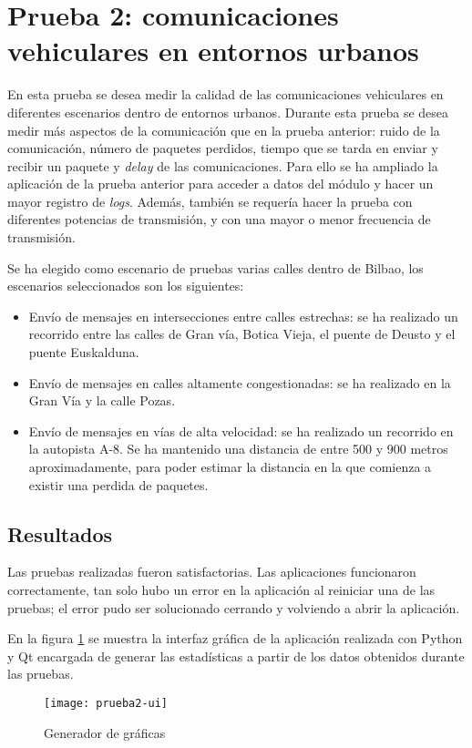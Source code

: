 \section{Prueba 2: comunicaciones vehiculares en entornos urbanos}
En esta prueba se desea medir la calidad de las comunicaciones vehiculares en
diferentes escenarios dentro de entornos urbanos. Durante esta prueba se desea
medir más aspectos de la comunicación que en la prueba anterior: ruido de la
comunicación, número de paquetes perdidos, tiempo que se tarda en enviar y
recibir un paquete y \emph{delay} de las comunicaciones. Para ello se ha
ampliado la aplicación de la prueba anterior para acceder a datos del módulo y
hacer un mayor registro de \emph{logs}. Además, también se requería hacer la
prueba con diferentes potencias de transmisión, y con una mayor o menor
frecuencia de transmisión.

Se ha elegido como escenario de pruebas varias calles dentro de Bilbao, los
escenarios seleccionados son los siguientes:
\begin{itemize}
	\item Envío de mensajes en intersecciones entre calles estrechas: se ha
	realizado un recorrido entre las calles de Gran vía, Botica Vieja, el puente
	de Deusto y el puente Euskalduna.
	\item Envío de mensajes en calles altamente congestionadas: se ha realizado
	en la Gran Vía y la calle Pozas.
	\item Envío de mensajes en vías de alta velocidad: se ha realizado un
	recorrido en la	autopista A-8. Se ha mantenido una distancia de entre 500 y
	900 metros aproximadamente, para poder estimar la distancia en la que
	comienza a existir una perdida de paquetes.
\end{itemize}

\subsection{Resultados}
Las pruebas realizadas fueron satisfactorias. Las aplicaciones funcionaron
correctamente, tan solo hubo un error en la aplicación al reiniciar una de las
pruebas; el error pudo ser solucionado cerrando y volviendo a abrir la
aplicación.

En la figura \ref{fig:prueba2-ui} se muestra la interfaz gráfica de la
aplicación realizada con Python y Qt encargada de generar las estadísticas a
partir de los datos obtenidos durante las pruebas.

\begin{figure}[H]
	\begin{center}
		\texttt{[image: prueba2-ui]}
		\caption{Generador de gráficas}
		\label{fig:prueba2-ui}
	\end{center}
\end{figure}
